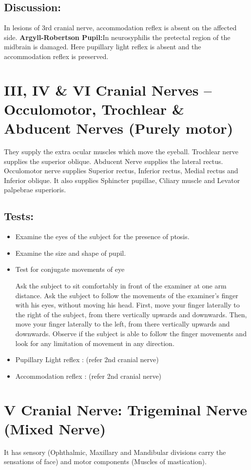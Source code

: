 \documentclass[a4paper,12pt,openany,twoside]{book}
\begin{document}
\subsection*{Discussion:}
	In lesions of 3rd cranial nerve, accommodation reflex is absent on the affected side. \textbf{Argyll-Robertson Pupil:}In neurosyphilis the pretectal region of the midbrain is damaged. Here pupillary light reflex is absent and the accommodation reflex is preserved.

\section*{III, IV \& VI Cranial Nerves –Occulomotor, Trochlear \& Abducent Nerves (Purely motor)}
They supply the extra ocular muscles which move the eyeball.  
Trochlear nerve supplies the superior oblique. 
Abducent Nerve supplies the lateral rectus.
Occulomotor nerve supplies Superior rectus, Inferior rectus, Medial rectus and Inferior oblique.
	It also supplies Sphincter pupillae, Ciliary muscle and Levator palpebrae superioris.
\subsection*{Tests:}
\begin{itemize}
\item{Examine the eyes of the subject for the presence of ptosis.}
\item{Examine the size and shape of pupil.}
\item{Test for conjugate movements of eye
	\par
	Ask the subject to sit comfortably in front of the examiner at one arm distance.  Ask the subject to follow the movements of the examiner's finger with his eyes, without moving his head. First, move your finger laterally to the right of the subject, from there vertically upwards and downwards.  Then, move your finger laterally to the left, from there vertically upwards and downwards.  Observe if the subject is able to follow the finger movements and look for any limitation of movement in any direction.}
\item{Pupillary Light reflex : (refer 2nd cranial nerve)}
\item{Accommodation reflex : (refer 2nd cranial nerve)}
\end{itemize}
\section*{V Cranial Nerve: Trigeminal Nerve (Mixed Nerve)}
	It has sensory (Ophthalmic, Maxillary and Mandibular divisions carry the sensations of face) and motor components (Muscles of mastication).
\end{document}
